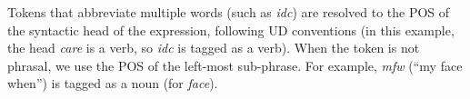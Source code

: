 \documentclass[11pt,a4paper]{article}
\begin{document}


Tokens that abbreviate multiple words (such as \emph{idc}) are resolved to the POS of the syntactic head of the
expression, following UD conventions (in this example, the head \emph{care} is
a verb, so \emph{idc} is tagged as a verb).
When the token is not phrasal, we use the POS of the left-most
sub-phrase.  For example, \emph{mfw} (``my face when'') is tagged as a
noun (for \emph{face}).  %
\end{document}
